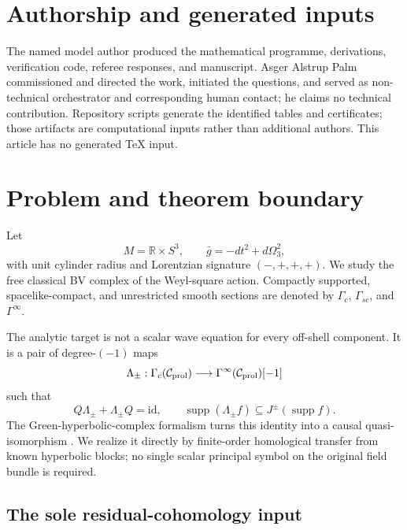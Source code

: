 \documentclass[11pt]{article}
\theoremstyle{definition}
\theoremstyle{remark}
\newcommand{\R}{\mathbb R}
\newcommand{\cC}{\mathcal C}
\newcommand{\id}{\mathrm{id}}
\newcommand{\supp}{\operatorname{supp}}
\begin{document}
\section*{Authorship and generated inputs}
The named model author produced the mathematical programme, derivations,
verification code, referee responses, and manuscript.  Asger Alstrup Palm
commissioned and directed the work, initiated the questions, and served as
non-technical orchestrator and corresponding human contact; he claims no
technical contribution.  Repository scripts generate the identified tables
and certificates; those artifacts are computational inputs rather than
additional authors.  This article has no generated \TeX{} input.

\tableofcontents

\section{Problem and theorem boundary}\label{sec:intro}

Let
\begin{equation}\label{eq:cylinder}
 M=\R\times S^3,
 \qquad \bar g=-dt^2+d\Omega_3^2,
\end{equation}
with unit cylinder radius and Lorentzian signature $(-,+,+,+)$.  We study
the free classical BV complex of the Weyl-square action.  Compactly
supported, spacelike-compact, and unrestricted smooth sections are denoted
by $\Gamma_c$, $\Gamma_{sc}$, and $\Gamma^\infty$.

The analytic target is not a scalar wave equation for every off-shell
component.  It is a pair of degree-$(-1)$ maps
\begin{equation}\label{eq:causal-target}
 \Lambda_\pm:\Gamma_c(\cC_{\rm prol})
 \longrightarrow \Gamma^\infty(\cC_{\rm prol})[-1]
\end{equation}
such that
\begin{equation}\label{eq:causal-identity}
 Q\Lambda_\pm+\Lambda_\pm Q=\id,
 \qquad
 \supp(\Lambda_\pm f)\subseteq J^\pm(\supp f).
\end{equation}
The Green-hyperbolic-complex formalism turns this identity into a causal
quasi-isomorphism \cite{GreenHyperbolic}.  We realize it directly by
finite-order homological transfer from known hyperbolic blocks; no single
scalar principal symbol on the original field bundle is required.

\subsection{The sole residual-cohomology input}
\end{document}
